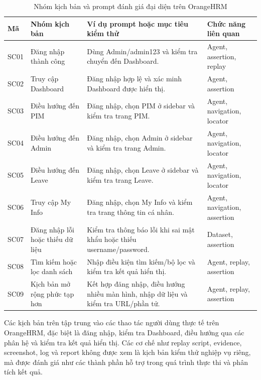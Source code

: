 {\scriptsize
\begin{table}[H]
\centering
\caption{Nhóm kịch bản và prompt đánh giá đại diện trên OrangeHRM}
\label{tab:chapter6_evaluation_scenarios}
\renewcommand{\arraystretch}{0.98}
\begin{tabular}{|p{1.4cm}|p{4.0cm}|p{5.8cm}|p{3.0cm}|}
\hline
\textbf{Mã} & \textbf{Nhóm kịch bản} & \textbf{Ví dụ prompt hoặc mục tiêu kiểm thử} & \textbf{Chức năng liên quan} \\
\hline
SC01 & Đăng nhập thành công & Dùng Admin/admin123 và kiểm tra chuyển đến Dashboard. & Agent, assertion, replay \\
\hline
SC02 & Truy cập Dashboard & Đăng nhập hợp lệ và xác minh Dashboard được hiển thị. & Agent, assertion \\
\hline
SC03 & Điều hướng đến PIM & Đăng nhập, chọn PIM ở sidebar và kiểm tra trang PIM. & Agent, navigation, locator \\
\hline
SC04 & Điều hướng đến Admin & Đăng nhập, chọn Admin ở sidebar và kiểm tra trang Admin. & Agent, navigation, locator \\
\hline
SC05 & Điều hướng đến Leave & Đăng nhập, chọn Leave ở sidebar và kiểm tra trang Leave. & Agent, navigation, locator \\
\hline
SC06 & Truy cập My Info & Đăng nhập, chọn My Info và kiểm tra trang thông tin cá nhân. & Agent, navigation, assertion \\
\hline
SC07 & Đăng nhập lỗi hoặc thiếu dữ liệu & Kiểm tra thông báo lỗi khi sai mật khẩu hoặc thiếu username/password. & Dataset, assertion \\
\hline
SC08 & Tìm kiếm hoặc lọc danh sách & Nhập điều kiện tìm kiếm/bộ lọc và kiểm tra kết quả hiển thị. & Agent, replay, assertion \\
\hline
SC09 & Kịch bản mở rộng phức tạp hơn & Kết hợp đăng nhập, điều hướng nhiều màn hình, nhập dữ liệu và kiểm tra URL/phần tử. & Agent, replay, assertion \\
\hline
\end{tabular}
\end{table}
}

Các kịch bản trên tập trung vào các thao tác người dùng thực tế trên OrangeHRM, đặc biệt là đăng nhập, kiểm tra Dashboard, điều hướng qua các phân hệ và kiểm tra kết quả hiển thị. Các cơ chế như replay script, evidence, screenshot, log và report không được xem là kịch bản kiểm thử nghiệp vụ riêng, mà được đánh giá như các thành phần hỗ trợ trong quá trình thực thi và phân tích kết quả.

